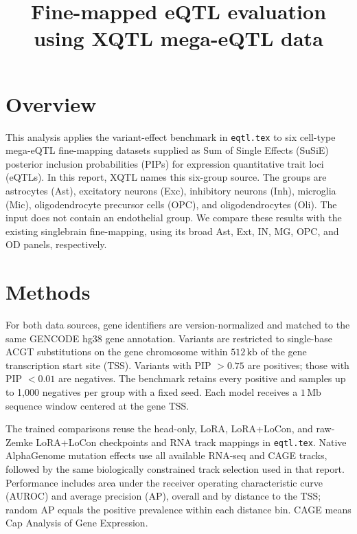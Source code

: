 \documentclass[11pt]{article}
\title{Fine-mapped eQTL evaluation using XQTL mega-eQTL data}
\author{}
\date{}
\begin{document}
\maketitle

\noindent{}

\section{Overview}
This analysis applies the variant-effect benchmark in \texttt{eqtl.tex} to
six cell-type mega-eQTL fine-mapping datasets supplied as Sum of Single
Effects (SuSiE) posterior
inclusion probabilities (PIPs) for expression quantitative trait loci
(eQTLs). In this report, XQTL names this six-group source. The groups are astrocytes (Ast),
excitatory neurons (Exc), inhibitory neurons (Inh), microglia (Mic),
oligodendrocyte precursor cells (OPC), and oligodendrocytes (Oli). The input
does not contain an endothelial group. We compare these results with the
existing singlebrain fine-mapping, using its broad Ast, Ext, IN, MG, OPC, and
OD panels, respectively.

\section{Methods}
For both data sources, gene identifiers are version-normalized and matched to
the same GENCODE hg38 gene annotation. Variants are restricted to single-base
ACGT substitutions on the gene chromosome within $512\,\mathrm{kb}$ of the
gene transcription start site (TSS). Variants with PIP $>0.75$ are positives;
those with PIP $<0.01$ are negatives. The benchmark retains every positive
and samples up to 1,000 negatives per group with a fixed seed. Each model receives
a $1\,\mathrm{Mb}$ sequence window centered at the gene TSS.

The trained comparisons reuse the head-only, LoRA, LoRA+LoCon, and raw-Zemke
LoRA+LoCon checkpoints and RNA track mappings in \texttt{eqtl.tex}. Native AlphaGenome mutation
effects use all available RNA-seq and CAGE tracks, followed by the same
biologically constrained track selection used in that report. Performance
includes area under the receiver operating characteristic curve (AUROC) and
average precision (AP), overall and by distance to the TSS; random AP equals
the positive prevalence within each distance bin. CAGE means Cap Analysis of
Gene Expression.
\end{document}
